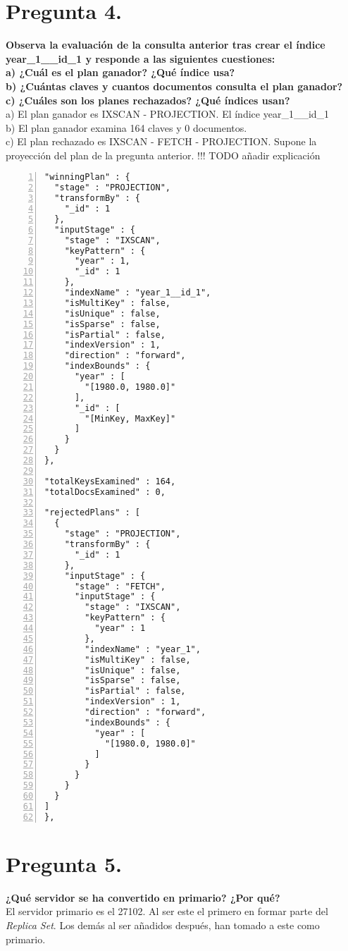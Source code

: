\documentclass{article}
\begin{document}
  \section{Pregunta 4.}
  \textbf{Observa la evaluación de la consulta anterior tras crear el índice year\_1\_\_id\_1 y responde a las siguientes cuestiones: \\
     a) ¿Cuál es el plan ganador? ¿Qué índice usa? \\
     b) ¿Cuántas claves y cuantos documentos consulta el plan ganador? \\
     c) ¿Cuáles son los planes rechazados? ¿Qué índices usan? \\}
   a) El plan ganador es IXSCAN - PROJECTION. El índice year\_1\_\_id\_1\\
   b) El plan ganador examina 164 claves y 0 documentos. \\
   c) El plan rechazado es IXSCAN - FETCH - PROJECTION. Supone la proyección del plan de la pregunta anterior. 
    !!! TODO añadir explicación
    \begin{lstlisting}[numbers=left,frame=single]
"winningPlan" : {
  "stage" : "PROJECTION",
  "transformBy" : {
    "_id" : 1
  },
  "inputStage" : {
    "stage" : "IXSCAN",
    "keyPattern" : {
      "year" : 1,
      "_id" : 1
    },
    "indexName" : "year_1__id_1",
    "isMultiKey" : false,
    "isUnique" : false,
    "isSparse" : false,
    "isPartial" : false,
    "indexVersion" : 1,
    "direction" : "forward",
    "indexBounds" : {
      "year" : [
        "[1980.0, 1980.0]"
      ],
      "_id" : [
        "[MinKey, MaxKey]"
      ]
    }
  }
},

"totalKeysExamined" : 164,
"totalDocsExamined" : 0,

"rejectedPlans" : [
  {
    "stage" : "PROJECTION",
    "transformBy" : {
      "_id" : 1
    },
    "inputStage" : {
      "stage" : "FETCH",
      "inputStage" : {
        "stage" : "IXSCAN",
        "keyPattern" : {
          "year" : 1
        },
        "indexName" : "year_1",
        "isMultiKey" : false,
        "isUnique" : false,
        "isSparse" : false,
        "isPartial" : false,
        "indexVersion" : 1,
        "direction" : "forward",
        "indexBounds" : {
          "year" : [
            "[1980.0, 1980.0]"
          ]
        }
      }
    }
  }
]
},
    \end{lstlisting}
  \newpage
  \section{Pregunta 5.}
  \textbf{¿Qué servidor se ha convertido en primario? ¿Por qué? \\}
    El servidor primario es el 27102. Al ser este el primero en formar parte
    del \emph{Replica Set}. Los demás al ser añadidos después, han tomado a
    este como primario.
\end{document}
